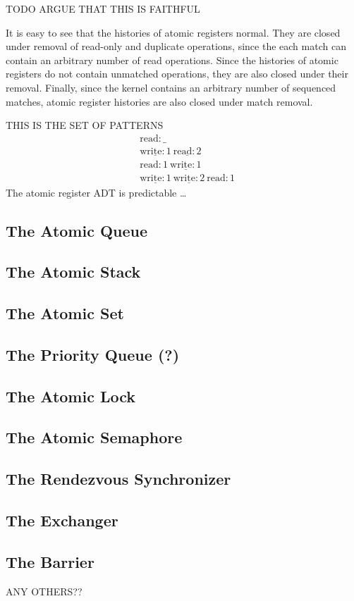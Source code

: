 TODO ARGUE THAT THIS IS FAITHFUL

It is easy to see that the histories of atomic registers normal. They are
closed under removal of read-only and duplicate operations, since the each
match can contain an arbitrary number of read operations. Since the histories
of atomic registers do not contain unmatched operations, they are also closed
under their removal. Finally, since the kernel contains an arbitrary number of
sequenced matches, atomic register histories are also closed under match
removal.

THIS IS THE SET OF PATTERNS
\begin{align*}
  & \mathrm{read}:\_ \\
  & \underline{\mathrm{write}:1}\ \underline{\mathrm{read}:2} \\
  & \mathrm{read}:1\ \underline{\mathrm{write}:1} \\
  & \underline{\mathrm{write}:1}\ \underline{\mathrm{write}:2}\ \mathrm{read}:1
\end{align*}
The atomic register ADT is predictable \ldots

\subsection{The Atomic Queue}

\subsection{The Atomic Stack}

\subsection{The Atomic Set}

\subsection{The Priority Queue (?)}

\subsection{The Atomic Lock}

\subsection{The Atomic Semaphore}

\subsection{The Rendezvous Synchronizer}

\subsection{The Exchanger}

\subsection{The Barrier}

ANY OTHERS??
